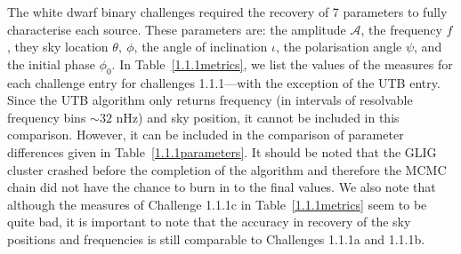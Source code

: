 \documentclass[12pt]{iopart}
\begin{document}
The white dwarf binary challenges required the recovery of 7 parameters to fully characterise each source. These parameters are: the amplitude $\mathcal{A}$, the frequency $f$, they sky location $\theta,~\phi$, the angle of inclination $\iota$, the polarisation angle $\psi$, and the initial phase $\phi_0$. In Table~\ref{1.1.1metrics}, we list the values of the measures for each challenge entry for challenges 1.1.1---with the exception of the UTB entry. Since the UTB algorithm only returns frequency (in intervals of resolvable frequency bins $\sim 32$ nHz) and sky position, it cannot be included in this comparison. However, it can be included in the comparison of parameter differences given in Table~\ref{1.1.1parameters}. It should be noted that the GLIG cluster crashed before the completion of the algorithm and therefore the MCMC chain did not have the chance to burn in to the final values. We also note that although the measures of Challenge 1.1.1c in Table~\ref{1.1.1metrics} seem to be quite bad, it is important to note that the accuracy in recovery of the sky positions and frequencies is still comparable to Challenges 1.1.1a and 1.1.1b.
\end{document}
